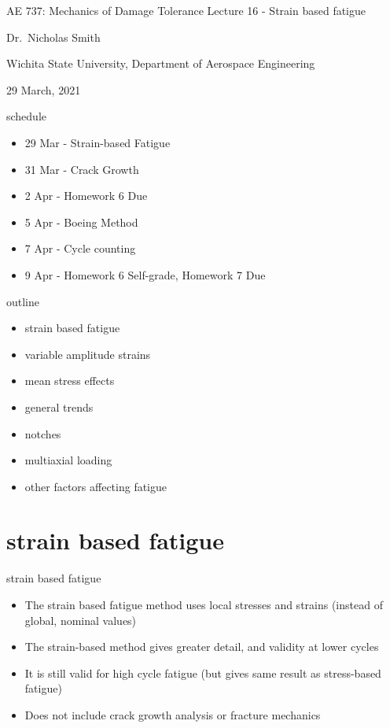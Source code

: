 \documentclass[
  letterpaper,
  ignorenonframetext,
  aspectratio=43,
  handout,
  12pt]{beamer}
\author{}
\date{}
\providecommand{\tightlist}{%
  \setlength{\itemsep}{0pt}\setlength{\parskip}{0pt}}
\providecommand{\tightlist}{%
\setlength{\itemsep}{0pt}\setlength{\parskip}{0pt}}
\begin{document}
\begin{frame}{AE 737: Mechanics of Damage Tolerance}
\protect\hypertarget{ae-737-mechanics-of-damage-tolerance}{}
Lecture 16 - Strain based fatigue

Dr.~Nicholas Smith

Wichita State University, Department of Aerospace Engineering

29 March, 2021
\end{frame}

\begin{frame}{schedule}
\protect\hypertarget{schedule}{}
\begin{itemize}
\tightlist
\item
  29 Mar - Strain-based Fatigue
\item
  31 Mar - Crack Growth
\item
  2 Apr - Homework 6 Due
\item
  5 Apr - Boeing Method
\item
  7 Apr - Cycle counting
\item
  9 Apr - Homework 6 Self-grade, Homework 7 Due
\end{itemize}
\end{frame}

\begin{frame}{outline}
\protect\hypertarget{outline}{}
\begin{itemize}
\tightlist
\item
  strain based fatigue
\item
  variable amplitude strains
\item
  mean stress effects
\item
  general trends
\item
  notches
\item
  multiaxial loading
\item
  other factors affecting fatigue
\end{itemize}
\end{frame}

\hypertarget{strain-based-fatigue}{%
\section{strain based fatigue}\label{strain-based-fatigue}}

\begin{frame}{strain based fatigue}
\protect\hypertarget{strain-based-fatigue-1}{}
\begin{itemize}
\tightlist
\item
  The strain based fatigue method uses local stresses and strains
  (instead of global, nominal values)
\item
  The strain-based method gives greater detail, and validity at lower
  cycles
\item
  It is still valid for high cycle fatigue (but gives same result as
  stress-based fatigue)
\item
  Does not include crack growth analysis or fracture mechanics
\end{itemize}
\end{frame}
\end{document}
